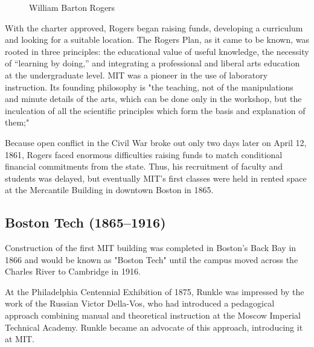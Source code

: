 \begin{figure}[h]
\caption{William Barton Rogers}
\end{figure}


With the charter approved, Rogers began raising funds, developing a curriculum and looking for a suitable location. The Rogers Plan, as it came to be known, was rooted in three principles: the educational value of useful knowledge, the necessity of “learning by doing,” and integrating a professional and liberal arts education at the undergraduate level. MIT was a pioneer in the use of laboratory instruction. Its founding philosophy is "the teaching, not of the manipulations and minute details of the arts, which can be done only in the workshop, but the inculcation of all the scientific principles which form the basis and explanation of them;"

Because open conflict in the Civil War broke out only two days later on April 12, 1861, Rogers faced enormous difficulties raising funds to match conditional financial commitments from the state. Thus, his recruitment of faculty and students was delayed, but eventually MIT's first classes were held in rented space at the Mercantile Building in downtown Boston in 1865.

\subsection{Boston Tech (1865–1916)}

Construction of the first MIT building was completed in Boston's Back Bay in 1866 and would be known as "Boston Tech" until the campus moved across the Charles River to Cambridge in 1916.

At the Philadelphia Centennial Exhibition of 1875, Runkle was impressed by the work of the Russian Victor Della-Vos, who had introduced a pedagogical approach combining manual and theoretical instruction at the Moscow Imperial Technical Academy. Runkle became an advocate of this approach, introducing it at MIT.

